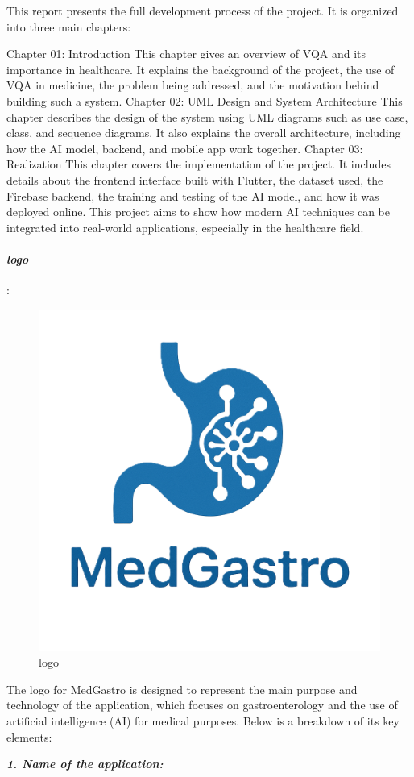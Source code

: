 \documentclass[12pt,a4paper]{report}
\begin{document}
This report presents the full development process of the project. It is organized into three main chapters:

Chapter 01: Introduction
This chapter gives an overview of VQA and its importance in healthcare. It explains the background of the project, the use of VQA in medicine, the problem being addressed, and the motivation behind building such a system.
Chapter 02: UML Design and System Architecture
This chapter describes the design of the system using UML diagrams such as use case, class, and sequence diagrams. It also explains the overall architecture, including how the AI model, backend, and mobile app work together.
Chapter 03: Realization
This chapter covers the implementation of the project. It includes details about the frontend interface built with Flutter, the dataset used, the Firebase backend, the training and testing of the AI model, and how it was deployed online.
This project aims to show how modern AI techniques can be integrated into real-world applications, especially in the healthcare field.
 \newpage


\paragraph{\textbf{\textit{logo}}}: 

\begin{figure}[h]
    \centering
   
    \includegraphics[width=0.5\linewidth]{test1.png}
    \caption{logo}
    \label{fig:enter-label}
\end{figure}

The logo for MedGastro is designed to represent the main purpose and technology of the application, which focuses on gastroenterology and the use of artificial intelligence (AI) for medical purposes. Below is a breakdown of its key elements:

\textbf{\textit{1. Name of the application:}}
\end{document}
